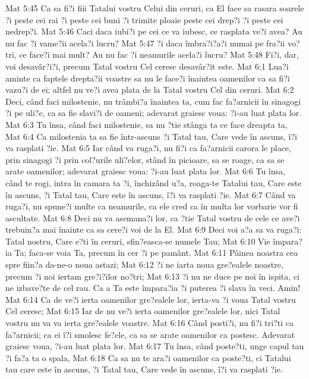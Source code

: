 Mat 5:45  Ca sa fi?i fiii Tatalui vostru Celui din ceruri, ca El face sa rasara soarele ?i peste cei rai ?i peste cei buni ?i trimite ploaie peste cei drep?i ?i peste cei nedrep?i.
Mat 5:46  Caci daca iubi?i pe cei ce va iubesc, ce rasplata ve?i avea? Au nu fac ?i vame?ii acela?i lucru?
Mat 5:47  ?i daca îmbra?i?a?i numai pe fra?ii vo?tri, ce face?i mai mult? Au nu fac ?i neamurile acela?i lucru?
Mat 5:48  Fi?i, dar, voi desavâr?i?i, precum Tatal vostru Cel ceresc desavâr?it este.
Mat 6:1  Lua?i aminte ca faptele drepta?ii voastre sa nu le face?i înaintea oamenilor ca sa fi?i vazu?i de ei; altfel nu ve?i avea plata de la Tatal vostru Cel din ceruri.
Mat 6:2  Deci, când faci milostenie, nu trâmbi?a înaintea ta, cum fac fa?arnicii în sinagogi ?i pe uli?e, ca sa fie slavi?i de oameni; adevarat graiesc voua: ?i-au luat plata lor.
Mat 6:3  Tu însa, când faci milostenie, sa nu ?tie stânga ta ce face dreapta ta,
Mat 6:4  Ca milostenia ta sa fie într-ascuns ?i Tatal tau, Care vede în ascuns, î?i va rasplati ?ie.
Mat 6:5  Iar când va ruga?i, nu fi?i ca fa?arnicii carora le place, prin sinagogi ?i prin col?urile uli?elor, stând în picioare, sa se roage, ca sa se arate oamenilor; adevarat graiesc voua: ?i-au luat plata lor.
Mat 6:6  Tu însa, când te rogi, intra în camara ta ?i, închizând u?a, roaga-te Tatalui tau, Care este în ascuns, ?i Tatal tau, Care este în ascuns, î?i va rasplati ?ie.
Mat 6:7  Când va ruga?i, nu spune?i multe ca neamurile, ca ele cred ca în multa lor vorbarie vor fi ascultate.
Mat 6:8  Deci nu va asemana?i lor, ca ?tie Tatal vostru de cele ce ave?i trebuin?a mai înainte ca sa cere?i voi de la El.
Mat 6:9  Deci voi a?a sa va ruga?i: Tatal nostru, Care e?ti în ceruri, sfin?easca-se numele Tau;
Mat 6:10  Vie împara?ia Ta; faca-se voia Ta, precum în cer ?i pe pamânt.
Mat 6:11  Pâinea noastra cea spre fiin?a da-ne-o noua astazi;
Mat 6:12  ?i ne iarta noua gre?ealele noastre, precum ?i noi iertam gre?i?ilor no?tri;
Mat 6:13  ?i nu ne duce pe noi în ispita, ci ne izbave?te de cel rau. Ca a Ta este împara?ia ?i puterea ?i slava în veci. Amin!
Mat 6:14  Ca de ve?i ierta oamenilor gre?ealele lor, ierta-va ?i voua Tatal vostru Cel ceresc;
Mat 6:15  Iar de nu ve?i ierta oamenilor gre?ealele lor, nici Tatal vostru nu va va ierta gre?ealele voastre.
Mat 6:16  Când posti?i, nu fi?i tri?ti ca fa?arnicii; ca ei î?i smolesc fe?ele, ca sa se arate oamenilor ca postesc. Adevarat graiesc voua, ?i-au luat plata lor.
Mat 6:17  Tu însa, când poste?ti, unge capul tau ?i fa?a ta o spala,
Mat 6:18  Ca sa nu te ara?i oamenilor ca poste?ti, ci Tatalui tau care este în ascuns, ?i Tatal tau, Care vede în ascuns, î?i va rasplati ?ie.
